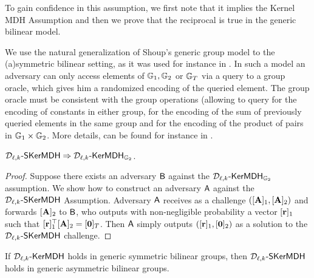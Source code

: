 To gain confidence in this assumption, we first note that it implies the Kernel MDH Assumption and then we prove that the reciprocal is true in the generic bilinear model. 

We use the natural generalization of Shoup's generic group model \cite{EC:Shoup97} to the (a)symmetric bilinear setting, as it was used for instance in \cite{EC:BonBoyGoh05}. In such a model an adversary can only access elements of $\mathbb{G}_1,\mathbb{G}_2$ or $\mathbb{G}_T$ via a query to a group oracle, which gives him a randomized  encoding of the queried element. The group oracle must be consistent with the group operations (allowing to query for the encoding of constants in either group, for the encoding of the sum of previously queried elements in the same group and for the encoding of the product of pairs in $\mathbb{G}_1\times \mathbb{G}_2$. More details, can be found for instance in  \cite{EC:BonBoyGoh05}.



\begin{lemma} $\mathcal{D}_{\ell,k}\mbox{-}\mathsf{SKerMDH} \Rightarrow \mathcal{D}_{\ell,k}\mbox{-}\mathsf{KerMDH}_{\mathbb{G}_2}$.
\end{lemma}
\begin{proof} Suppose there exists an adversary $\mathsf{B}$ against the 
$\mathcal{D}_{\ell,k}\mbox{-}\mathsf{KerMDH}_{\mathbb{G}_2}$ assumption. We show how to construct an adversary $\mathsf{A}$ against the  $\mathcal{D}_{\ell,k}\mbox{-}\mathsf{SKerMDH}$ Assumption. Adversary $\mathsf{A}$ receives as a challenge $([\mathbf{{A}}]_1,[\mathbf{{A}}]_2)$ and forwards $[\mathbf{{A}}]_2$ to $\mathsf{B}$, who outputs with non-negligible probability a vector $[\mathbf{r}]_1$ such that $[\mathbf{r}]_1^{\top} [\mathbf{{A}}]_2=[\mathbf{0}]_{T}$. Then $\mathsf{A}$  simply outputs $([\mathbf{r}]_1,[\mathbf{0}]_2)$ as a solution to the $\mathcal{D}_{\ell,k}\mbox{-}\mathsf{SKerMDH}$ challenge. 
\end{proof}

\begin{lemma} If $\mathcal{D}_{\ell,k}\mbox{-}\mathsf{KerMDH}$ holds in generic symmetric bilinear groups, then $\mathcal{D}_{\ell,k}\mbox{-}\mathsf{SKerMDH}$ holds in generic asymmetric bilinear groups. 
\end{lemma}

